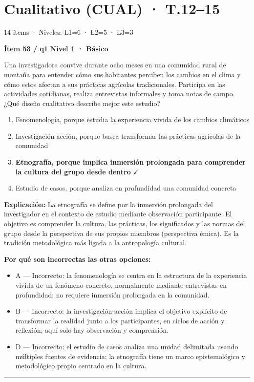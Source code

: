 \documentclass[12pt,a4paper]{article}
\begin{document}
\section{Cualitativo (CUAL) · T.12--15}
{\small\color{gris} 14 ítems · Niveles: L1=6 · L2=5 · L3=3}

\begin{mdframed}[backgroundcolor=fondogris,linecolor=azul,linewidth=1pt,innerleftmargin=10pt,innerrightmargin=10pt,innertopmargin=7pt,innerbottommargin=7pt]
\textbf{Ítem 53 / q1} \hfill {\small\bfseries\color{azul} Nivel 1 · Básico}
\end{mdframed}

Una investigadora convive durante ocho meses en una comunidad rural de montaña para entender cómo sus habitantes perciben los cambios en el clima y cómo estos afectan a sus prácticas agrícolas tradicionales. Participa en las actividades cotidianas, realiza entrevistas informales y toma notas de campo. ¿Qué diseño cualitativo describe mejor este estudio?

\begin{enumerate}
  \item[A.] Fenomenología, porque estudia la experiencia vivida de los cambios climáticos
  \item[B.] Investigación-acción, porque busca transformar las prácticas agrícolas de la comunidad
  \item[\textbf{\color{verde}C.}] \textbf{\color{verde} Etnografía, porque implica inmersión prolongada para comprender la cultura del grupo desde dentro} \hfill $\checkmark$
  \item[D.] Estudio de casos, porque analiza en profundidad una comunidad concreta
\end{enumerate}

\noindent\textbf{\color{azul}Explicación:} La etnografía se define por la inmersión prolongada del investigador en el contexto de estudio mediante observación participante. El objetivo es comprender la cultura, las prácticas, los significados y las normas del grupo desde la perspectiva de sus propios miembros (perspectiva émica). Es la tradición metodológica más ligada a la antropología cultural.

\noindent\textbf{\color{gris}Por qué son incorrectas las otras opciones:}
\begin{itemize}
  \item {\small A — Incorrecto: la fenomenología se centra en la estructura de la experiencia vivida de un fenómeno concreto, normalmente mediante entrevistas en profundidad; no requiere inmersión prolongada en la comunidad.}
  \item {\small B — Incorrecto: la investigación-acción implica el objetivo explícito de transformar la realidad junto a los participantes, en ciclos de acción y reflexión; aquí solo hay observación y comprensión.}
  \item {\small D — Incorrecto: el estudio de casos analiza una unidad delimitada usando múltiples fuentes de evidencia; la etnografía tiene un marco epistemológico y metodológico propio centrado en la cultura.}
\end{itemize}
\vspace{8pt}\hrule\vspace{10pt}
\end{document}
